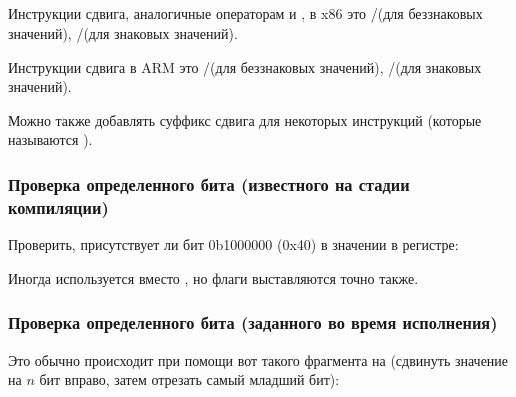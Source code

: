 ﻿%
\subsection{\Conclusion{}}

Инструкции сдвига, аналогичные операторам \CCpp \TT{$\ll$} и \TT{$\gg$}, в x86 это \SHR/\SHL (для беззнаковых значений), \SAR/\SHL (для знаковых значений).

Инструкции сдвига в ARM это \LSR/\LSL (для беззнаковых значений), \ASR/\LSL (для знаковых значений).

Можно также добавлять суффикс сдвига для некоторых инструкций 
(которые называются ).


\subsubsection{Проверка определенного бита (известного на стадии компиляции)}

Проверить, присутствует ли бит 0b1000000 (0x40) в значении в регистре:









Иногда \AND используется вместо \TEST, но флаги выставляются точно также.

\subsubsection{Проверка определенного бита (заданного во время исполнения)}

Это обычно происходит при помощи вот такого фрагмента на \CCpp (сдвинуть значение на $n$ бит вправо,
затем отрезать самый младший бит):



